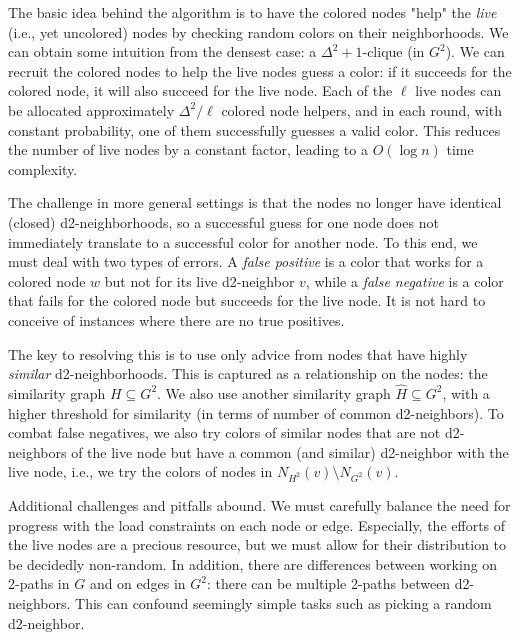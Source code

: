 The basic idea behind the  algorithm is to have the colored nodes "help" the \emph{live} (i.e., yet uncolored) nodes by checking random colors on their neighborhoods.
%
We can obtain some intuition from the densest case: a $\Delta^2+1$-clique (in $G^2$).
We can recruit the colored nodes to help the live nodes guess a color: if it succeeds for the colored node, it will also succeed for the live node. Each of the $\ell$ live nodes can be allocated approximately $\Delta^2/\ell$ colored node helpers, and in each round, with constant probability, one of them successfully guesses a valid color. This reduces the number of live nodes by a constant factor, leading to a $O(\log n)$ time complexity.

The challenge in more general settings is that the nodes no longer have identical (closed) d2-neighborhoods, so a successful guess for one node does not immediately translate to a successful color for another node. To this end, we must deal with two types of errors.
A \emph{false positive} is a color that works for a colored node $w$ but not for its live d2-neighbor $v$, while a \emph{false negative} is a color that fails for the colored node but succeeds for the live node. It is not hard to conceive of instances where there are no true positives.

The key to resolving this is to use only advice from nodes that have highly \emph{similar} d2-neighborhoods.
This is captured as a relationship on the nodes: the similarity graph $H\subseteq G^2$. We also use another similarity graph $\hat{H}\subseteq G^2$, with a higher threshold for similarity (in terms of number of common d2-neighbors).
To combat false negatives, we also try colors of similar nodes that are not d2-neighbors of the live node but have a common (and similar) d2-neighbor with the live node, i.e., we try the colors of nodes in $N_{H^2}(v) \setminus N_{G^2}(v)$.

Additional challenges and pitfalls abound. We must carefully balance the need for progress with the load constraints on each node or edge. Especially, the efforts of the live nodes are a precious resource, but we must allow for their distribution to be decidedly non-random.  
In addition, there are differences between working on 2-paths in $G$ and on edges in $G^2$: there can be multiple 2-paths between d2-neighbors. This can confound seemingly simple tasks such as picking a random d2-neighbor.

